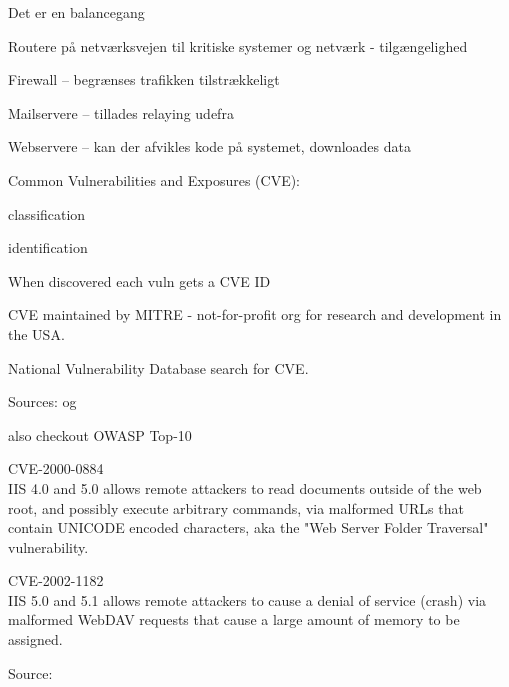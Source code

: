 \documentclass[Screen16to9,17pt]{foils}
\begin{document}
\centerline{Det er en balancegang}




\begin{list2}
\item Routere på netværksvejen til kritiske systemer og netværk -
  tilgængelighed
\item Firewall -- begrænses trafikken tilstrækkeligt
\item Mailservere -- tillades relaying udefra
\item Webservere -- kan der afvikles kode på systemet, downloades data
\end{list2}






\begin{list1}
\item Common Vulnerabilities and Exposures (CVE):
  \begin{list2}
  \item classification
  \item identification
  \end{list2}
\item When discovered each vuln gets a CVE ID
\item CVE maintained by MITRE - not-for-profit
org for research and development in the USA.
\item National Vulnerability Database search for CVE.
\item Sources:  og 
\item also checkout OWASP Top-10 
\end{list1}


\begin{list1}
\item \small CVE-2000-0884\\
IIS 4.0 and 5.0 allows remote attackers to read documents outside of
the web root, and possibly execute arbitrary commands, via malformed
URLs that contain UNICODE encoded characters, aka the "Web Server
Folder Traversal" vulnerability.

\item \small CVE-2002-1182\\
IIS 5.0 and 5.1 allows remote attackers to cause a denial of service
(crash) via malformed WebDAV requests that cause a large amount of
memory to be assigned.

\item Source:\\
\end{list1}
\end{document}
